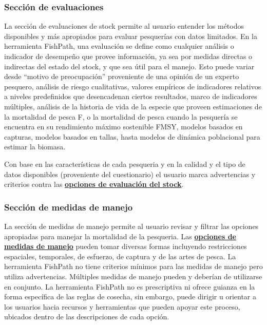 \documentclass[
  11pt,
]{book}
\begin{document}
\hypertarget{secciuxf3n-de-evaluaciones}{%
\subsubsection{Sección de evaluaciones}\label{secciuxf3n-de-evaluaciones}}

La sección de evaluaciones de stock permite al usuario entender los métodos disponibles y más apropiados para evaluar pesquerías con datos limitados. En la herramienta FishPath, una evaluación se define como cualquier análisis o indicador de desempeño que provee información, ya sea por medidas directas o indirectas del estado del stock, y que sea útil para el manejo. Esto puede variar desde ``motivo de preocupación'' proveniente de una opinión de un experto pesquero, análisis de riesgo cualitativas, valores empíricos de indicadores relativos a niveles predefinidos que desencadenan ciertos resultados, marco de indicadores múltiples, análisis de la historia de vida de la especie que proveen estimaciones de la mortalidad de pesca F, o la mortalidad de pesca cuando la pesquería se encuentra en su rendimiento máximo sostenible FMSY, modelos basados en capturas, modelos basados en tallas, hasta modelos de dinámica poblacional para estimar la biomasa.

Con base en las características de cada pesqueria y en la calidad y el tipo de datos disponibles (proveniente del cuestionario) el usuario marca advertencias y criterios contra las \protect\hyperlink{Assessment-Categories}{\textbf{opciones de evaluación del stock}}.

\hypertarget{secciuxf3n-de-medidas-de-manejo}{%
\subsubsection{Sección de medidas de manejo}\label{secciuxf3n-de-medidas-de-manejo}}

La sección de medidas de manejo permite al usuario revisar y filtrar las opciones apropiadas para manejar la mortalidad de la pesqueria. Las \protect\hyperlink{Management-Measure-Categories}{\textbf{opciones de medidas de manejo}} pueden tomar diversas formas incluyendo restricciones espaciales, temporales, de esfuerzo, de captura y de las artes de pesca. La herramienta FishPath no tiene criterios mínimos para las medidas de manejo pero utiliza advertencias. Múltiples medidas de manejo pueden y deberían de utilizarse en conjunto. La herramienta FishPath no es prescriptiva ni ofrece guianza en la forma específica de las reglas de cosecha, sin embargo, puede dirigir u orientar a los usuarios hacia recursos y herramientas que pueden apoyar este proceso, ubicados dentro de las descripciones de cada opción.
\end{document}
